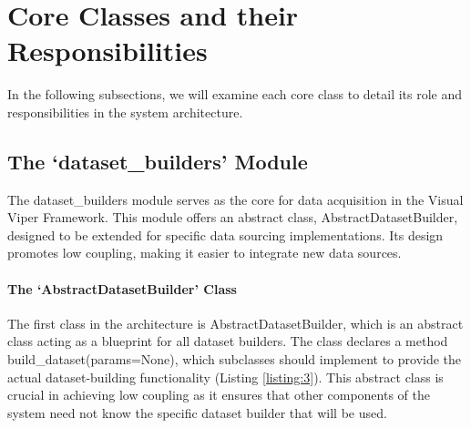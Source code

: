 \section{Core Classes and their
Responsibilities}\label{core-classes-and-their-responsibilities}

In the following subsections, we will examine each core class to detail
its role and responsibilities in the system architecture.

\subsection{The `dataset\_builders'
Module}\label{the-dataset_builders-module}

The dataset\_builders module serves as the core for data acquisition in
the Visual Viper Framework. This module offers an abstract class,
AbstractDatasetBuilder, designed to be extended for specific data
sourcing implementations. Its design promotes low coupling, making it
easier to integrate new data sources.

\paragraph{The `AbstractDatasetBuilder'
Class}\label{the-abstractdatasetbuilder-class}

The first class in the architecture is AbstractDatasetBuilder, which is
an abstract class acting as a blueprint for all dataset builders. The
class declares a method build\_dataset(params=None), which subclasses
should implement to provide the actual dataset-building functionality
(Listing \ref{listing:3}). This abstract class is crucial in achieving low coupling as
it ensures that other components of the system need not know the
specific dataset builder that will be used.


